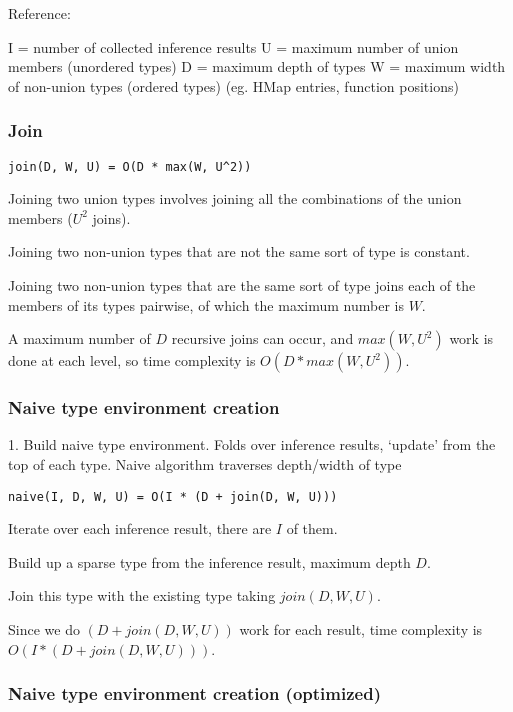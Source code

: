 \documentclass[10pt]{article}
\begin{document}
Reference:

I = number of collected inference results
U = maximum number of union members (unordered types)
D = maximum depth of types
W = maximum width of non-union types (ordered types) (eg. HMap entries, function positions)

\subsubsection*{Join}

\begin{verbatim}
join(D, W, U) = O(D * max(W, U^2))
\end{verbatim}

Joining two union types involves joining all the combinations of the union members ($U^2$ joins).

Joining two non-union types that are not the same sort of type is constant.

Joining two non-union types that are the same sort of type joins
each of the members of its types pairwise, of which the maximum number is $W$.

A maximum number of $D$ recursive joins can occur, and $max(W, U^2)$ work is done
at each level, so time complexity is $O(D * max(W, U^2))$.

\subsubsection*{Naive type environment creation}

1. Build naive type environment.
	 Folds over inference results, `update' from the top of each type.
	 Naive algorithm traverses depth/width of type 

\begin{verbatim}
naive(I, D, W, U) = O(I * (D + join(D, W, U)))
\end{verbatim}

Iterate over each inference result, there are $I$ of them.

Build up a sparse type from the inference result, maximum depth $D$.

Join this type with the existing type taking $join(D, W, U)$.

Since we do $(D + join(D, W, U))$ work for each result, time complexity
is $O(I * (D + join(D, W, U)))$.

\subsubsection*{Naive type environment creation (optimized)}
\end{document}
